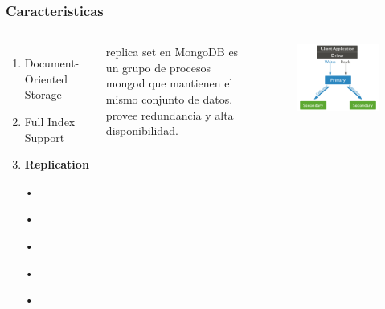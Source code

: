 \documentclass{beamer}
\begin{document}
\begin{frame}
\frametitle{Caracteristicas}
\begin{columns}[c] %

\begin{enumerate}
\item Document-Oriented Storage
\item Full Index Support
\item \textbf{Replication}
\item[•]	
\item[•]	
\item[•]	
\item[•]	
\item[•]	
\end{enumerate}

replica set en MongoDB es un grupo de procesos mongod que mantienen el mismo conjunto de datos. provee redundancia y alta disponibilidad.
\begin{figure}
\includegraphics[width=0.6\linewidth]{replica-set-read-write-operations-primary.png}
\end{figure}
\end{columns}
\end{frame}
\end{document}
